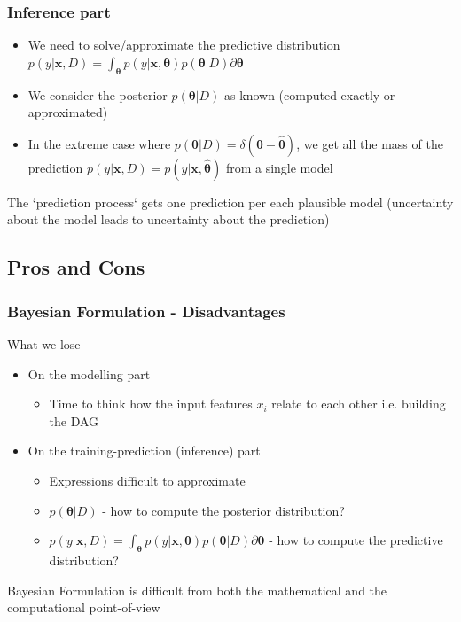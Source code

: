 \documentclass{beamer}
\newcommand{\thetab}{\boldsymbol{\theta}}
\newcommand{\xb}{\boldsymbol{x}}
\begin{document}
\begin{frame}
  \frametitle{Inference part}
  \begin{itemize}
  \item We need to solve/approximate the predictive distribution $p(y|\xb, D) = \int_{\thetab} p(y|\xb,\thetab)p(\thetab|D) \partial \thetab$
  \item We consider the posterior $p(\thetab|D)$ as known (computed exactly or approximated)
  \item In the extreme case where
    $p(\thetab|D) = \delta(\thetab - \hat{\thetab})$, we get all the mass of the
    prediction $p(y|\xb, D) = p(y|\xb,\hat{\thetab})$ from a single model
  \end{itemize}

    \noindent\makebox[\linewidth]{\rule{\paperwidth}{0.4pt}}
  The `prediction process` gets one prediction per each
    plausible model (\alert{uncertainty about the model leads to uncertainty about the
    prediction})


\end{frame}

\subsection{Pros and Cons}
\begin{frame}
  \frametitle{Bayesian Formulation - Disadvantages}
  What we lose
  \begin{itemize}
  \item On the modelling part
    \begin{itemize}
    \item Time to think how the input features $x_i$ relate to each
      other i.e. building the DAG
    \end{itemize}
    \item On the training-prediction (inference) part
      \begin{itemize}
        \item Expressions difficult to approximate
        \item $p(\thetab|D)$ - how to compute the posterior distribution?
        \item $p(y|\xb,D) = \int_{\thetab} p(y|\xb, \thetab) p(\thetab|D)\partial \thetab$ - how to compute the predictive distribution?
      \end{itemize}
    \end{itemize}
\noindent\makebox[\linewidth]{\rule{\paperwidth}{0.4pt}}
Bayesian Formulation is \alert{difficult from both the mathematical and the computational point-of-view}
\end{frame}
\end{document}
